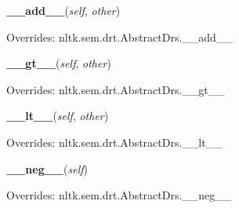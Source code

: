     \vspace{0.5ex}

\hspace{.8\funcindent}\begin{boxedminipage}{\funcwidth}

    \raggedright \textbf{\_\_add\_\_}(\textit{self}, \textit{other})

\setlength{\parskip}{2ex}
\setlength{\parskip}{1ex}
      Overrides: nltk.sem.drt.AbstractDrs.\_\_add\_\_

    \end{boxedminipage}

    \vspace{0.5ex}

\hspace{.8\funcindent}\begin{boxedminipage}{\funcwidth}

    \raggedright \textbf{\_\_gt\_\_}(\textit{self}, \textit{other})

\setlength{\parskip}{2ex}
\setlength{\parskip}{1ex}
      Overrides: nltk.sem.drt.AbstractDrs.\_\_gt\_\_

    \end{boxedminipage}

    \vspace{0.5ex}

\hspace{.8\funcindent}\begin{boxedminipage}{\funcwidth}

    \raggedright \textbf{\_\_lt\_\_}(\textit{self}, \textit{other})

\setlength{\parskip}{2ex}
\setlength{\parskip}{1ex}
      Overrides: nltk.sem.drt.AbstractDrs.\_\_lt\_\_

    \end{boxedminipage}

    \vspace{0.5ex}

\hspace{.8\funcindent}\begin{boxedminipage}{\funcwidth}

    \raggedright \textbf{\_\_neg\_\_}(\textit{self})

\setlength{\parskip}{2ex}
\setlength{\parskip}{1ex}
      Overrides: nltk.sem.drt.AbstractDrs.\_\_neg\_\_

    \end{boxedminipage}

    \vspace{0.5ex}

